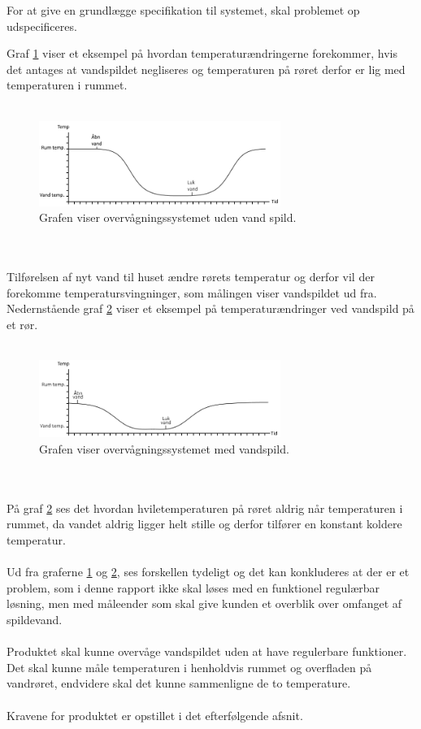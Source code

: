 For at give en grundlægge specifikation til systemet, skal problemet op udspecificeres.  

Graf \ref{vandspild_graf_normal} viser et eksempel på hvordan temperaturændringerne forekommer, hvis det antages at vandspildet negliseres og temperaturen på røret derfor er lig med temperaturen i rummet. 
\\
\\
\begin{figure}[h!]
  \centering
  \includegraphics[width=0.7\textwidth]{figures/vandspild_graf_normal.png}
  \caption{Grafen viser overvågningssystemet uden vand spild.}
  \label{vandspild_graf_normal}
\end{figure}
\\
\\
Tilførelsen af nyt vand til huset ændre rørets temperatur og derfor vil der forekomme temperatursvingninger, som målingen viser vandspildet ud fra. Nedernstående graf \ref{vandspild_graf_spild} viser et eksempel på temperaturændringer ved vandspild på et rør.
\\
\\
\begin{figure}[h!]
  \centering
  \includegraphics[width=0.7\textwidth]{figures/vandspild_graf_spild.png}
  \caption{Grafen viser overvågningssystemet med vandspild.}
  \label{vandspild_graf_spild}
\end{figure}
\\
\\
På graf \ref{vandspild_graf_spild} ses det hvordan hviletemperaturen på røret aldrig når temperaturen i rummet, da vandet aldrig ligger helt stille og derfor tilfører en konstant koldere temperatur.
\\
\\
Ud fra graferne \ref{vandspild_graf_normal} og \ref{vandspild_graf_spild}, ses forskellen tydeligt og det kan konkluderes at der er et problem, som i denne rapport ikke skal løses med en funktionel regulærbar løsning, men med måleender som skal give kunden et overblik over omfanget af spildevand.
\\
\\
Produktet skal kunne overvåge vandspildet uden at have regulerbare funktioner. Det skal kunne måle temperaturen i henholdvis rummet og overfladen på vandrøret, endvidere skal det kunne sammenligne de to temperature.
\\
\\
Kravene for produktet er opstillet i det efterfølgende afsnit.     